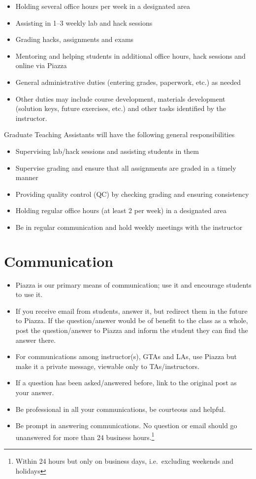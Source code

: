 \documentclass[12pt]{scrartcl}
\begin{document}
\begin{itemize}
  \item Holding several office hours per week in a designated area
  \item Assisting in 1--3 weekly lab and hack sessions
  \item Grading hacks, assignments and exams
  \item Mentoring and helping students in additional office hours, hack sessions
  and online via Piazza
  \item General administrative duties (entering grades, paperwork, etc.) as needed
  \item Other duties may include course development, materials development 
  (solution keys, future exercises, etc.) and other tasks identified by the instructor.
\end{itemize}

Graduate Teaching Assistants will have the following general responsibilities
\begin{itemize}
  \item Supervising lab/hack sessions and assisting students in them
  \item Supervise grading and ensure that all assignments are graded 
    in a timely manner
  \item Providing quality control (QC) by checking grading and ensuring consistency
  \item Holding regular office hours (at least 2 per week) in a designated area
  \item Be in regular communication and hold weekly meetings with the instructor
\end{itemize}


\section*{Communication}

\begin{itemize}
  \item Piazza is our primary means of communication; use it and encourage 
students to use it.  
  \item If you receive email from students, answer it, 
but redirect them in the future to Piazza.  If the question/answer
would be of benefit to the class as a whole, post the question/answer
to Piazza and inform the student they can find the answer there.
  \item For communications among instructor(s), GTAs and LAs, use Piazza but
make it a private message, viewable only to TAs/instructors.
  \item If a question has been asked/answered before, link to the original
  post as your answer.  
  \item Be professional in all your communications, be courteous and
  helpful.  
  \item Be prompt in answering communications.  No question or email should go 
  unanswered for more than 24 business hours.\footnote{Within 24 hours but only
  on business days, i.e.\ excluding weekends and holidays}
\end{itemize}
\end{document}
